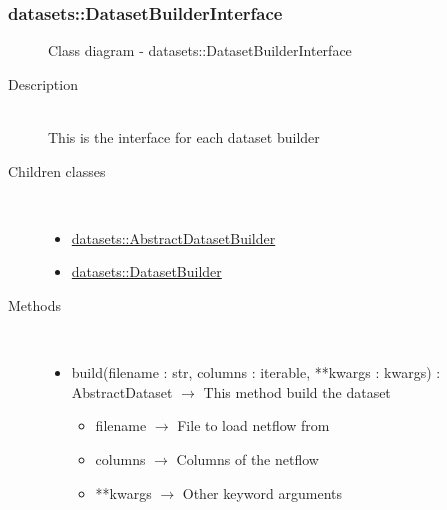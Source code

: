 \subsubsection[DatasetBuilderInterface]{datasets::DatasetBuilderInterface}
\begin{figure}[h]
\centering
{}
\caption{Class diagram - datasets::DatasetBuilderInterface}
\end{figure}\begin{description}
\item[Description] \hfill \\
 This is the interface for each dataset builder
\item[Children classes] \hfill \\
 \vspace{-1cm}
\begin{itemize}
\item \hyperlink{datasets::AbstractDatasetBuilder}{datasets::AbstractDatasetBuilder}
\item \hyperlink{datasets::DatasetBuilder}{datasets::DatasetBuilder}
\end{itemize}

\item[Methods] \hfill \\
 \vspace{-1cm}
\begin{itemize}
\item build(filename : str, columns : iterable, **kwargs : kwargs) : AbstractDataset $\rightarrow$ This method build the dataset\begin{itemize}
\item filename $\rightarrow$ File to load netflow from
\item columns $\rightarrow$ Columns of the netflow
\item **kwargs $\rightarrow$ Other keyword arguments
\end{itemize}

\end{itemize}

\end{description}
\hypertarget{datasets::AbstractDatasetBuilder}{}
